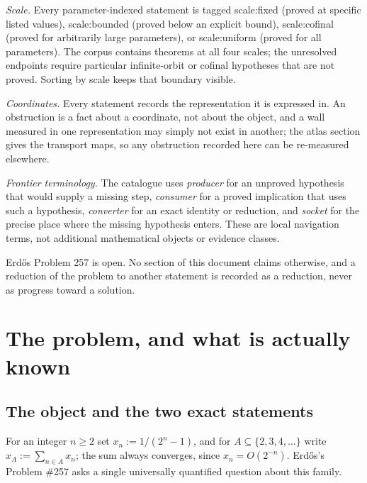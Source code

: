 \documentclass[11pt]{article}
\theoremstyle{plain}
\theoremstyle{definition}
\theoremstyle{remark}
\newcommand{\scale}[1]{{\small\textsf{scale:#1}}\xspace}
\begin{document}
\emph{Scale.}  Every parameter-indexed statement is tagged \scale{fixed} (proved
at specific listed values), \scale{bounded} (proved below an explicit bound),
\scale{cofinal} (proved for arbitrarily large parameters), or \scale{uniform}
(proved for all parameters).  The corpus contains theorems at all four scales;
the unresolved endpoints require particular infinite-orbit or cofinal
hypotheses that are not proved.  Sorting by scale keeps that boundary visible.

\emph{Coordinates.}  Every statement records the representation it is expressed
in.  An obstruction is a fact about a coordinate, not about the object, and a
wall measured in one representation may simply not exist in another; the atlas
section gives the transport maps, so any obstruction recorded here can be
re-measured elsewhere.

\emph{Frontier terminology.}  The catalogue uses \emph{producer} for an
unproved hypothesis that would supply a missing step, \emph{consumer} for a
proved implication that uses such a hypothesis, \emph{converter} for an exact
identity or reduction, and \emph{socket} for the precise place where the
missing hypothesis enters.  These are local navigation terms, not additional
mathematical objects or evidence classes.

Erd\H{o}s Problem 257 is open.  No section of this document claims
otherwise, and a reduction of the problem to another statement is recorded as a
reduction, never as progress toward a solution.
\clearpage
\tableofcontents
\clearpage
%

\section{The problem, and what is actually known}
\label{sec:257-problem}

\subsection{The object and the two exact statements}

For an integer $n \ge 2$ set $x_n := 1/(2^n-1)$, and for $A \subseteq \{2,3,4,\dots\}$ write
$x_A := \sum_{n \in A} x_n$; the sum always converges, since $x_n = O(2^{-n})$. Erd\H{o}s's
Problem \#257 asks a single universally quantified question about this family.
\end{document}
